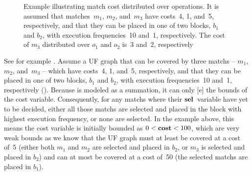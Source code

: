 \begin{figure}
  \caption[Example illustrating match cost distributed over operations]%
          {%
            Example illustrating match cost distributed over operations.
            It is assumed that matches~$m_1$, $m_2$, and~$m_3$ have costs~4,
            1, and~5, respectively, and that they can be placed in one of two
            blocks, $b_1$ and $b_2$, with execution frequencies~10 and~1,
            respectively.
            The cost of $m_3$ distributed over $o_1$ and $o_2$ is~3 and~2,
            respectively%
          }
\end{figure}
%
See for example .
%
Assume a \gls{UF graph} that can be covered by three \glspl{match} -- $m_1$,
$m_2$, and~$m_3$ -- which have costs~4, 1, and~5, respectively, and that they
can be placed in one of two blocks, $b_1$ and $b_2$, with execution
frequencies~10 and~1, respectively ().
%
Because  is modeled as a summation, it can
only [e] the bounds of the \gls{cost variable}.
%
Consequently, for any \glspl{match} where their $\mVar{sel}$~\gls{variable} have
yet to be decided, either all those \glspl{match} are selected and placed in the
\gls{block} with highest execution frequency, or none are selected.
%
In the example above, this means the \gls{cost variable} is initially bounded as
\mbox{$0 < \mVar{cost} < 100$}, which are very weak bounds as we know that the
\gls{UF graph} must at least be covered at a cost of~5 (either both $m_1$ and
$m_2$ are selected and placed in $b_2$, or $m_3$ is selected and placed in
$b_2$) and can at most be covered at a cost of~\num{50} (the selected
\glspl{match} are placed in $b_1$).

